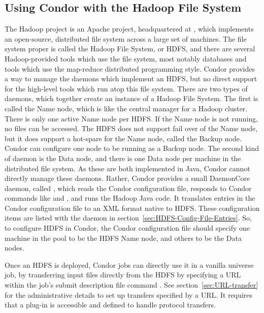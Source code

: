\subsection{\label{sec:Condor-HDFS}Using Condor with the Hadoop File System}

The Hadoop project is an Apache project,
headquartered at , 
which implements an open-source, distributed file system across a large set
of machines.  
The file system proper is called the Hadoop File System, or HDFS,
and there are several Hadoop-provided tools which use the file system,
most notably databases and tools which use 
the map-reduce distributed programming style.  
Condor provides a way to manage the daemons which implement an HDFS,
but no direct support for the high-level tools which run atop this file system.
There are two types of daemons, which together create an instance of 
a Hadoop File System.
The first is called the Name node, 
which is like the central manager for a Hadoop cluster.
There is only one active Name node per HDFS.
If the Name node is not running, no files can be accessed.
The HDFS does not support fail over of the Name node,
but it does support a hot-spare for the Name node,
called the Backup node.
Condor can configure one node to be running as a Backup node.
The second kind of daemon is the Data node,
and there is one Data node per machine in the distributed file system.
As these are both implemented in Java,
Condor cannot directly manage these daemons.
Rather, Condor provides a small DaemonCore daemon,
called ,
which reads the Condor configuration file, 
responds to Condor commands like  and ,
and runs the Hadoop Java code.
It translates entries in the Condor configuration file 
to an XML format native to HDFS.
These configuration items are listed with the 
 daemon in section~\ref{sec:HDFS-Config-File-Entries}. 
So, to configure HDFS in Condor,
the Condor configuration file should specify one machine in the
pool to be the HDFS Name node, and others to be the Data nodes.

Once an HDFS is deployed, 
Condor jobs can directly use it in a vanilla universe job,
by transferring input files directly from the HDFS by specifying 
a URL within the job's submit description file command
. 
See section~\ref{sec:URL-transfer} for the administrative details
to set up transfers specified by a URL.
It requires that a plug-in is accessible and defined to handle
 protocol transfers. 

